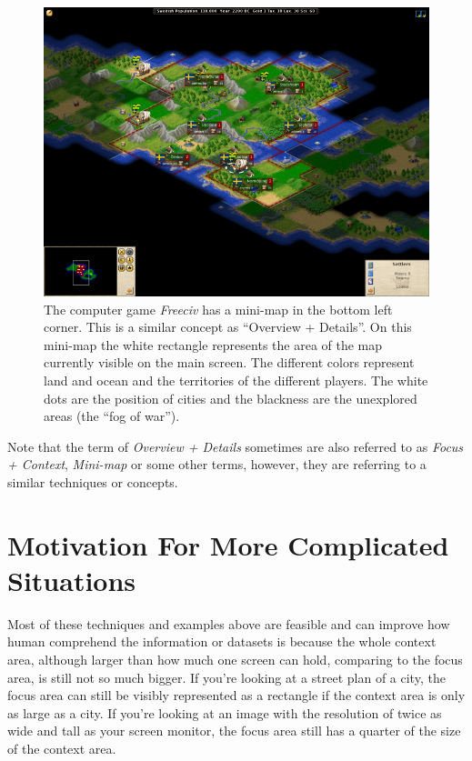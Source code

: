 \begin{figure}[th]
\centering
\includegraphics[width=\textwidth,keepaspectratio]{Figures/Chapter1/minimap.png}
\decoRule
\caption[Overview Plus Details In Computer Games]{The computer game \emph{Freeciv} has a mini-map in the bottom left corner. This is a similar concept as ``Overview + Details''. On this mini-map the white rectangle represents the area of the map currently visible on the main screen. The different colors represent land and ocean and the territories of the different players. The white dots are the position of cities and the blackness are the unexplored areas (the ``fog of war'')\cite{wiki:minimap}.}
\label{fig:minimap}
\end{figure}

Note that the term of \emph{Overview + Details} sometimes are also referred to as \emph{Focus + Context}, \emph{Mini-map} or some other terms, however, they are referring to a similar techniques or concepts. 


\section{Motivation For More Complicated Situations}

Most of these techniques and examples above are feasible and can improve how human comprehend the information or datasets is because the whole context area, although larger than how much one screen can hold, comparing to the focus area, is still not so much bigger. If you're looking at a street plan of a city, the focus area can still be visibly represented as a rectangle if the context area is only as large as a city. If you're looking at an image with the resolution of twice as wide and tall as your screen monitor, the focus area still has a quarter of the size of the context area.

